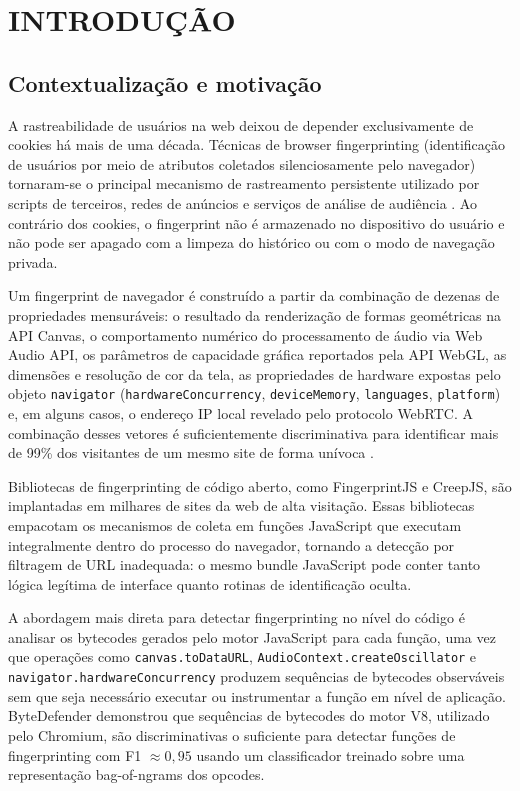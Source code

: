 \chapter{INTRODUÇÃO}
\label{cap:intro}

\section{Contextualização e motivação}
\label{sec:contexto}

A rastreabilidade de usuários na web deixou de depender exclusivamente de
cookies há mais de uma década. Técnicas de browser fingerprinting
(identificação de usuários por meio de atributos coletados silenciosamente pelo
navegador) tornaram-se o principal mecanismo de rastreamento persistente
utilizado por scripts de terceiros, redes de anúncios e serviços de análise de
audiência \cite{eckersley2010}. Ao contrário dos cookies, o
fingerprint não é armazenado no dispositivo do usuário e não pode ser
apagado com a limpeza do histórico ou com o modo de navegação privada.

Um fingerprint de navegador é construído a partir da combinação de dezenas
de propriedades mensuráveis: o resultado da renderização de formas geométricas na
API Canvas, o comportamento numérico do processamento de áudio via Web Audio API,
os parâmetros de capacidade gráfica reportados pela API WebGL, as dimensões e
resolução de cor da tela, as propriedades de hardware expostas pelo objeto
\texttt{navigator} (\texttt{hardwareConcurrency}, \texttt{deviceMemory},
\texttt{languages}, \texttt{platform}) e, em alguns casos, o endereço IP local
revelado pelo protocolo WebRTC. A combinação desses vetores é suficientemente
discriminativa para identificar mais de 99\% dos visitantes de um mesmo site de
forma unívoca \cite{laperdrix2016}.

Bibliotecas de fingerprinting de código aberto, como FingerprintJS e
CreepJS, são implantadas em milhares de sites da web de alta visitação. Essas
bibliotecas empacotam os mecanismos de coleta em funções JavaScript que executam
integralmente dentro do processo do navegador, tornando a detecção por filtragem
de URL inadequada: o mesmo bundle JavaScript pode conter tanto lógica
legítima de interface quanto rotinas de identificação oculta.

A abordagem mais direta para detectar fingerprinting no nível do código é
analisar os bytecodes gerados pelo motor JavaScript para cada função, uma vez que
operações como \texttt{canvas.toDataURL}, \texttt{AudioContext.createOscillator} e
\texttt{navigator.hardwareConcurrency} produzem sequências de bytecodes observáveis
sem que seja necessário executar ou instrumentar a função em nível de aplicação.
ByteDefender \cite{nikkhahbahrami2025} demonstrou que sequências de bytecodes do
motor V8, utilizado pelo Chromium, são discriminativas o suficiente para
detectar funções de fingerprinting com F1 $\approx 0{,}95$ usando um
classificador treinado sobre uma representação bag-of-ngrams dos opcodes.

